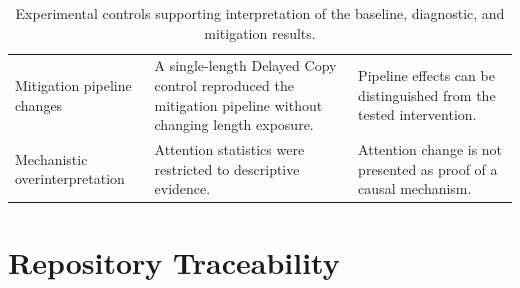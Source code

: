 \documentclass[
    author={Aanchala Ravindra Bhongade},
    supervisor={Dr. Fernando Moreno-Pino},
    degree={MSc},
    title={Length Generalisation in Transformer-Based Sequence Models: Failure Taxonomy and Mitigation Strategies},
    subtitle={},
    type={},
    year={2026}
]{dissertation}
\begin{document}
\begin{table}[htbp]
\begin{tabular}{
    p{}
    p{}
    p{}
}
Mitigation pipeline changes &
A single-length Delayed Copy control reproduced the mitigation pipeline
without changing length exposure. &
Pipeline effects can be distinguished from the tested intervention. \\

Mechanistic overinterpretation &
Attention statistics were restricted to descriptive evidence. &
Attention change is not presented as proof of a causal mechanism. \\
\hline
\end{tabular}
\caption{Experimental controls supporting interpretation of the baseline,
diagnostic, and mitigation results.}
\label{tab:appendix-experimental-controls}
\end{table}


\section{Repository Traceability}
\label{app:repository-traceability}
\end{document}

